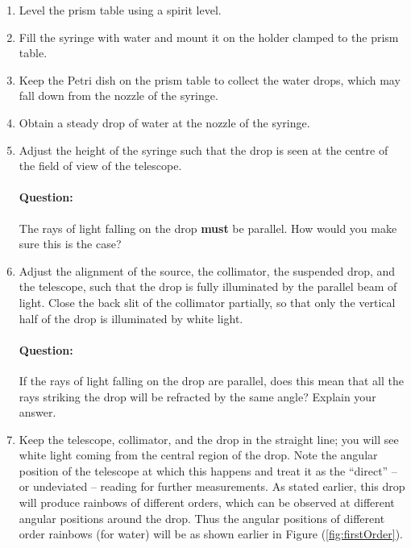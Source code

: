 \begin{enumerate}
    \item Level the prism table using a spirit level. 
    
    \item Fill the syringe with water and mount it on the holder clamped to the prism table.
    
    \item Keep the Petri dish on the prism table to collect the water drops, which may fall down from the nozzle of the syringe. 
    
    \item Obtain a steady drop of water at the nozzle of the syringe. 
    
    \item Adjust the height of the syringe such that the drop is seen at the centre of the field of view of the telescope.
    
    \begin{question}
    \paragraph{Question:} The rays of light falling on the drop \textbf{must} be parallel. How would you make sure this is the case?
    \end{question}
    
    \item Adjust the alignment of the source, the collimator, the suspended drop, and the telescope, such that the drop is fully illuminated by the parallel beam of light. Close the back slit of the collimator partially, so that only the vertical half of the drop is illuminated by white light.

    \begin{question}
    \paragraph{Question:} If the rays of light falling on the drop are parallel, does this mean that all the rays striking the drop will be refracted by the same angle? Explain your answer.
    \end{question}
    
    \item Keep the telescope, collimator, and the drop in the straight line; you will see white light coming from the central region of the drop. Note the angular position of the telescope at which this happens and treat it as the ``direct'' -- or undeviated --  reading for further measurements. As stated earlier, this drop will produce rainbows of different orders, which can be observed at different angular positions around the drop. Thus the angular positions of different order rainbows (for water) will be as shown earlier in Figure (\ref{fig:firstOrder}). 


\end{enumerate}
